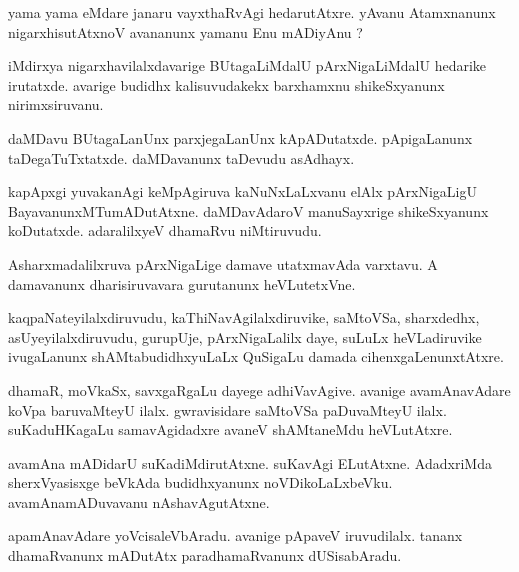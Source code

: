 \documentclass{article}
\begin{document}
\begin{mn}
yama  yama  eMdare  janaru  vayxthaRvAgi  hedarutAtxre.  yAvanu  Atamxnanunx  
nigarxhisutAtxnoV  avananunx  yamanu  Enu  mADiyAnu ?
\end{mn}

\begin{mn}
iMdirxya nigarxhavilalxdavarige  BUtagaLiMdalU  pArxNigaLiMdalU  hedarike  irutatxde.  
avarige  budidhx  kalisuvudakekx  barxhamxnu  shikeSxyanunx  nirimxsiruvanu.
\end{mn}

\begin{mn}
daMDavu  BUtagaLanUnx  parxjegaLanUnx  kApADutatxde.  pApigaLanunx  taDegaTuTxtatxde.  
daMDavanunx  taDevudu  asAdhayx.
\end{mn}

\begin{mn}
kapApxgi  yuvakanAgi  keMpAgiruva  kaNuNxLaLxvanu  elAlx  pArxNigaLigU  
BayavanunxMTumADutAtxne.  daMDavAdaroV  manuSayxrige  shikeSxyanunx  
koDutatxde.  adaralilxyeV  dhamaRvu  niMtiruvudu.
\end{mn}

\begin{mn}
Asharxmadalilxruva  pArxNigaLige  damave  utatxmavAda  varxtavu.  A  damavanunx  
dharisiruvavara  gurutanunx  heVLutetxVne.
\end{mn}

\begin{mn}
kaqpaNateyilalxdiruvudu,  kaThiNavAgilalxdiruvike,  saMtoVSa,  sharxdedhx,  
asUyeyilalxdiruvudu,  gurupUje,  pArxNigaLalilx  daye,  suLuLx  heVLadiruvike  
ivugaLanunx  shAMtabudidhxyuLaLx  QuSigaLu  damada  cihenxgaLenunxtAtxre.
\end{mn}

\begin{mn}
dhamaR,  moVkaSx,  savxgaRgaLu  dayege  adhiVavAgive.  avanige  avamAnavAdare  
koVpa baruvaMteyU  ilalx.  gwravisidare  saMtoVSa paDuvaMteyU  ilalx.  
suKaduHKagaLu  samavAgidadxre  avaneV  shAMtaneMdu  heVLutAtxre.
\end{mn}

\begin{mn}
avamAna mADidarU  suKadiMdirutAtxne.  suKavAgi  ELutAtxne.  AdadxriMda  sherxVyasisxge  
beVkAda  budidhxyanunx  noVDikoLaLxbeVku.  avamAnamADuvavanu  nAshavAgutAtxne.
\end{mn}

\begin{mn}
apamAnavAdare  yoVcisaleVbAradu.  avanige  pApaveV  iruvudilalx.  tananx  
dhamaRvanunx  mADutAtx  paradhamaRvanunx  dUSisabAradu.
\end{mn}
\end{document}
